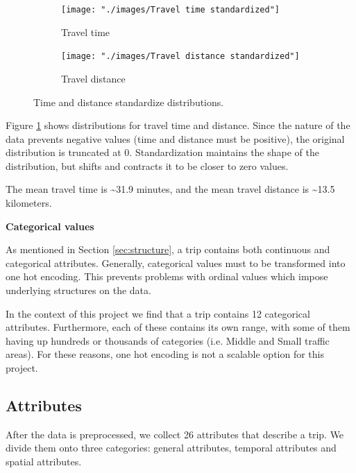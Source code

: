 \documentclass{article}
\begin{document}
\begin{figure}[H]
  \centering
  \begin{subfigure}[b]{.45\textwidth}
  	\centering
  	\texttt{[image: "./images/Travel time standardized"]}
  	\caption{Travel time}
  \end{subfigure}
  \begin{subfigure}[b]{.45\textwidth}
  	\centering
  	\texttt{[image: "./images/Travel distance standardized"]}
  	\caption{Travel distance}
  \end{subfigure}
  \caption{Time and distance standardize distributions.}
  	\label{fig:preprocessing/timeDist}
\end{figure}

Figure \ref{fig:preprocessing/timeDist} shows distributions for travel time and distance. Since the nature of the data prevents negative values (time and distance must be positive), the original distribution is truncated at 0. Standardization maintains the shape of the distribution, but shifts and contracts it to be closer to zero values.

The mean travel time is \textasciitilde 31.9 minutes, and the mean travel distance is \textasciitilde 13.5 kilometers.  %


\textbf{Categorical values}

As mentioned in Section \ref{sec:structure}, a trip contains both continuous and categorical attributes. Generally, categorical values must to be transformed into one hot encoding. This prevents problems with ordinal values which impose underlying structures on the data.

In the context of this project we find that a trip contains 12 categorical attributes. Furthermore, each of these contains its own range, with some of them having up hundreds or thousands of categories (i.e. Middle and Small traffic areas). For these reasons, one hot encoding is not a scalable option for this project.


\subsection{Attributes}
\label{sec:attributes}
After the data is preprocessed, we collect 26 attributes that describe a trip. We divide them onto three categories: general attributes, temporal attributes and spatial attributes. 
\end{document}
